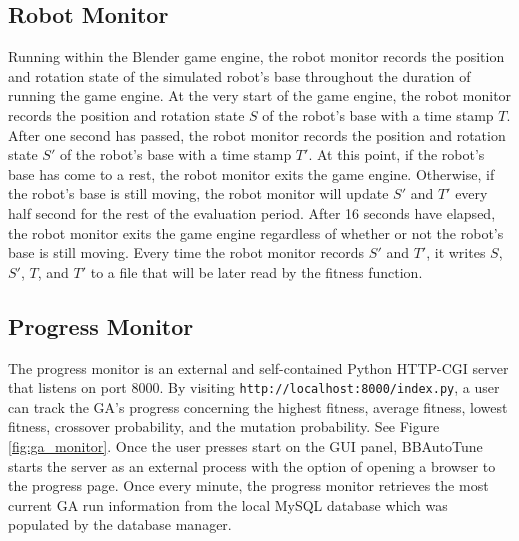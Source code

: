 \subsection{Robot Monitor}

Running within the Blender game engine, the robot monitor records the position and rotation state of the simulated robot's base throughout the duration of running the game engine. At the very start of the game engine, the robot monitor records the position and rotation state $S$ of the robot's base with a time stamp $T$. After one second has passed, the robot monitor records the position and rotation state $S'$ of the robot's base with a time stamp $T'$. At this point, if the robot's base has come to a rest, the robot monitor exits the game engine. Otherwise, if the robot's base is still moving, the robot monitor will update $S'$ and $T'$ every half second for the rest of the evaluation period. After 16 seconds have elapsed, the robot monitor exits the game engine regardless of whether or not the robot's base is still moving. Every time the robot monitor records $S'$ and $T'$, it writes $S$, $S'$, $T$, and $T'$ to a file that will be later read by the fitness function.  

\subsection{Progress Monitor}

The progress monitor is an external and self-contained Python HTTP-CGI server that listens on port 8000. By visiting  \texttt{http://localhost:8000/index.py}, a user can track the GA's progress concerning the highest fitness, average fitness, lowest fitness, crossover probability, and the mutation probability. See Figure \ref{fig:ga_monitor}. Once the user presses start on the GUI panel, BBAutoTune starts the server as an external process with the option of opening a browser to the progress page. Once every minute, the progress monitor retrieves the most current GA run information from the local MySQL database which was populated by the database manager.

